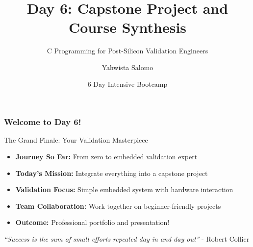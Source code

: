 \documentclass{beamer}
\title{Day 6: Capstone Project and Course Synthesis}
\subtitle{C Programming for Post-Silicon Validation Engineers}
\author{Yahwista Salomo}
\date{6-Day Intensive Bootcamp}
\institute{Post-Silicon Validation Training Program}
\begin{document}
\frame{\titlepage}

\begin{frame}
\frametitle{Welcome to Day 6!}
\begin{center}
\Large The Grand Finale: Your Validation Masterpiece
\end{center}

\begin{itemize}
    \item \footnotesize \textbf{Journey So Far:} From zero to embedded validation expert
    \item \footnotesize \textbf{Today's Mission:} Integrate everything into a capstone project
    \item \footnotesize \textbf{Validation Focus:} Simple embedded system with hardware interaction
    \item \footnotesize \textbf{Team Collaboration:} Work together on beginner-friendly projects
    \item \footnotesize \textbf{Outcome:} Professional portfolio and presentation!
\end{itemize}

\vspace{0.5cm}
\begin{center}
\textit{``Success is the sum of small efforts repeated day in and day out''} - Robert Collier
\end{center}
\end{frame}
\end{document}
